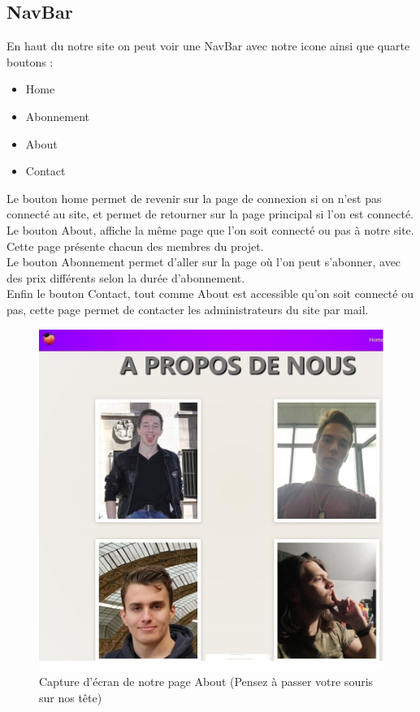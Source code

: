 \documentclass[12pt]{report}
\begin{document}
\subsection{NavBar}
	En haut du notre site on peut voir une NavBar avec notre icone ainsi que quarte boutons : \\
	\begin{itemize}
		\item Home
		\item Abonnement
		\item About 
		\item Contact
	\end{itemize}
Le bouton home permet de revenir sur la page de connexion si on n'est pas connecté au site, et permet de retourner sur la page principal si l'on est connecté.\\
Le bouton About, affiche la même page que l'on soit connecté ou pas à notre site. Cette page présente chacun des membres du projet.\\
Le bouton Abonnement permet d'aller sur la page où l'on peut s'abonner, avec des prix différents selon la durée d'abonnement.\\
Enfin le bouton Contact, tout comme About est accessible qu'on soit connecté ou pas, cette page permet de contacter les administrateurs du site par mail.
\begin{figure}[h!]
	\begin{center}
		\includegraphics[scale=0.6]{Aboutus.jpg}
	\end{center}
		\caption{Capture d'écran de notre page About (Pensez à passer votre souris sur nos tête)}
\end{figure}
\clearpage
\end{document}
